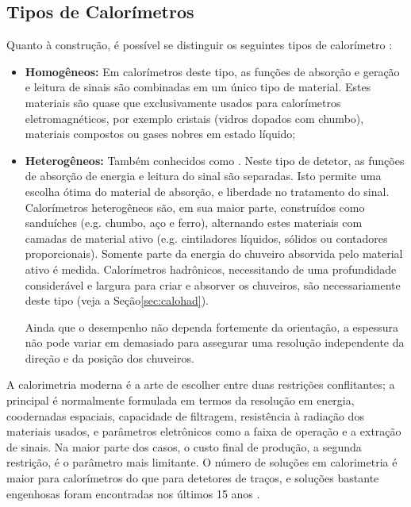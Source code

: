 \subsection{Tipos de Calorímetros}

Quanto à construção, é possível se distinguir os seguintes tipos de
calorímetro \cite{bock:detector, hadcal}:

\begin{itemize}
  \item \textbf{Homogêneos:} Em calorímetros
  deste tipo, as funções de absorção e geração e leitura de sinais são
  combinadas em um único tipo de material. Estes materiais são quase que
  exclusivamente usados para calorímetros eletromagnéticos, por exemplo
  cristais (vidros dopados com chumbo), materiais compostos ou gases nobres em
  estado líquido;

  \item \textbf{Heterogêneos:} Tam\-bém
  conhecidos como . Neste tipo de
  detetor, as fun\-ções de ab\-sor\-ção de energia e leitura do sinal são
  separadas. Isto permite uma escolha ótima do material de absorção, e
  liberdade no tratamento do sinal. Calorímetros heterogêneos são, em sua
  maior parte, construídos como sanduíches (e.g. chumbo, aço e ferro),
  alternando estes materiais com camadas de material ativo (e.g. cintiladores
  líquidos, sólidos ou contadores proporcionais). Somente parte da energia do
  chuveiro absorvida pelo material ativo é medida. Calorímetros hadrônicos,
  necessitando de uma profundidade considerável e largura para criar e
  absorver os chuveiros, são necessariamente deste tipo (veja a
  Seção\ref{sec:calohad}).

  Ainda que o desempenho não dependa fortemente da orientação, a espessura não
  pode variar em demasiado para assegurar uma resolução independente da
  direção e da posição dos chuveiros.
\end{itemize}

A calorimetria moderna é a arte de escolher entre duas restrições
conflitantes; a principal é normalmente formulada em termos da resolução em
energia, coodernadas espaciais, capacidade de filtragem, resistência à
radiação dos materiais usados, e parâmetros eletrônicos como a faixa de
operação e a extração de sinais. Na maior parte dos casos, o custo final de
produção, a segunda restrição, é o parâmetro mais limitante. O número de
soluções em calorimetria é maior para calorímetros do que para detetores de
traços, e soluções bastante engenhosas foram encontradas nos últimos 15 anos
\cite{hadcal}.

